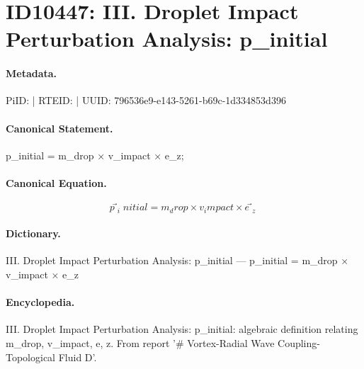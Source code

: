 \section*{ID10447: III. Droplet Impact Perturbation Analysis: p⃗\_initial}
\paragraph{Metadata.}
PiID:  | RTEID:  | UUID: 796536e9-e143-5261-b69c-1d334853d396

\paragraph{Canonical Statement.}
p⃗\_initial = m\_drop × v\_impact × e⃗\_z;

\paragraph{Canonical Equation.}
\[
p⃗_initial = m_drop × v_impact × e⃗_z
\]

\paragraph{Dictionary.}
III. Droplet Impact Perturbation Analysis: p⃗\_initial — p⃗\_initial = m\_drop × v\_impact × e⃗\_z

\paragraph{Encyclopedia.}
III. Droplet Impact Perturbation Analysis: p⃗\_initial: algebraic definition relating m\_drop, v\_impact, e, z. From report '\# Vortex-Radial Wave Coupling- Topological Fluid D'.
